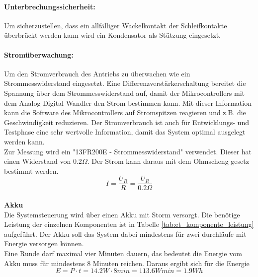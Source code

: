 \documentclass[../../main.tex]{subfiles}
\begin{document}
    \paragraph{Unterbrechungssicherheit:}
    Um sicherzustellen, dass ein allfälliger Wackelkontakt der Schleifkontakte überbrückt werden kann wird ein Kondensator als Stützung eingesetzt.
    \paragraph{Stromüberwachung:}
    Um den Stromverbrauch des Antriebs zu überwachen wie ein Strommesswiderstand eingesetzt. Eine Differenzverstärkerschaltung bereitet die Spannung über dem Strommesswiderstand auf, damit der Mikrocontrollers mit dem Analog-Digital Wandler den Strom bestimmen kann. Mit dieser Information kann die Software des Mikrocontrollers auf Stromspitzen reagieren und z.B. die Geschwindigkeit reduzieren. Der Stromverbrauch ist auch für Entwicklungs- und Testphase eine sehr wertvolle Information, damit das System optimal ausgelegt werden kann.  \\
    Zur Messung wird ein "13FR200E - Strommesswiderstand" verwendet. Dieser hat einen Widerstand von $0.2\Omega$. Der Strom kann daraus mit dem Ohmscheng gesetz bestimmt werden. $$I=\frac{U_R}{R}=\frac{U_R}{0.2\Omega} $$
    \\
    \textbf{Akku}\\
    Die Systemsteuerung wird über einen Akku mit Storm versorgt. Die benötige Leistung der einzelnen Komponenten ist in Tabelle \ref{tab:et_komponente_leistung} aufgeführt. Der Akku soll das System dabei mindestens für zwei durchläufe mit Energie versorgen können.\\
    Eine Runde darf maximal vier Minuten dauern, das bedeutet die Energie vom Akku muss für mindestens 8 Minuten reichen. Daraus ergibt sich für die Energie $$E=P\cdot t = 14.2W \cdot 8min = 113.6Wmin = 1.9Wh$$

\end{document}
